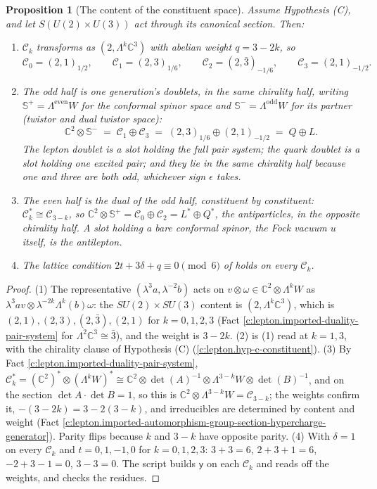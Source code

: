\documentclass[11pt]{article}
\newtheorem{proposition}[theorem]{Proposition}
\theoremstyle{definition}
\theoremstyle{plain}
\providecommand{\C}{}\renewcommand{\C}{\mathbb{C}}
\providecommand{\CS}{}\renewcommand{\CS}{{\mathbb{S}^{+}}}
\providecommand{\CSm}{}\renewcommand{\CSm}{{\mathbb{S}^{-}}}
\providecommand{\Con}{}\renewcommand{\Con}{\mathcal{C}}
\begin{document}
\begin{proposition}[The content of the constituent space]\label{c:lepton.content-constituent-space}
Assume Hypothesis (C), and let $S(U(2) \times U(3))$ act through its canonical section. Then:
\begin{enumerate}
\item $\Con_{k}$ transforms as $(2, \Lambda^{k}\C^{3})$ with abelian weight $q = 3 - 2k$, so
\[
\Con_{0} = (2,1)_{1/2}, \qquad \Con_{1} = (2,3)_{1/6}, \qquad \Con_{2} = (2,\bar{3})_{-1/6}, \qquad \Con_{3} = (2,1)_{-1/2}.
\]
\item The odd half is one generation's doublets, in the same chirality half, writing $\CS = \Lambda^{\mathrm{even}}W$ for the conformal spinor space and $\CSm{} = \Lambda^{\mathrm{odd}}W$ for its partner (twistor and dual twistor space):
\[
\C^{2} \otimes \CSm{} \;=\; \Con_{1} \oplus \Con_{3} \;=\; (2,3)_{1/6} \oplus (2,1)_{-1/2} \;=\; Q \oplus L.
\]
The lepton doublet is a slot holding the full pair system; the quark doublet is a slot holding one excited pair; and they lie in the same chirality half because one and three are both odd, whichever sign $\epsilon$ takes.
\item The even half is the dual of the odd half, constituent by constituent: $\Con_{k}^{*} \cong \Con_{3-k}$, so $\C^{2} \otimes \CS = \Con_{0} \oplus \Con_{2} = L^{*} \oplus Q^{*}$, the antiparticles, in the opposite chirality half. A slot holding a bare conformal spinor, the Fock vacuum $u$ itself, is the antilepton.
\item The lattice condition $2t + 3\delta + q \equiv 0 \pmod 6$ of \cite[Thm.~4.2(ii)]{ButlerT12} holds on every $\Con_{k}$.
\end{enumerate}
\end{proposition}
\begin{proof}
(1) The representative $(\lambda^{3}a, \lambda^{-2}b)$ acts on $v \otimes \omega \in \C^{2} \otimes \Lambda^{k}W$ as $\lambda^{3}av \otimes \lambda^{-2k}\Lambda^{k}(b)\omega$: the $SU(2) \times SU(3)$ content is $(2, \Lambda^{k}\C^{3})$, which is $(2,1), (2,3), (2,\bar{3}), (2,1)$ for $k = 0, 1, 2, 3$ (Fact \ref{c:lepton.imported-duality-pair-system} for $\Lambda^{2}\C^{3} \cong \bar{3}$), and the weight is $3 - 2k$. (2) is (1) read at $k = 1, 3$, with the chirality clause of Hypothesis (C) (\ref{c:lepton.hyp-c-constituent}). (3) By Fact \ref{c:lepton.imported-duality-pair-system}, $\Con_{k}^{*} = (\C^{2})^{*} \otimes (\Lambda^{k}W)^{*} \cong \C^{2} \otimes \det(A)^{-1} \otimes \Lambda^{3-k}W \otimes \det(B)^{-1}$, and on the section $\det A \cdot \det B = 1$, so this is $\C^{2} \otimes \Lambda^{3-k}W = \Con_{3-k}$; the weights confirm it, $-(3 - 2k) = 3 - 2(3-k)$, and irreducibles are determined by content and weight (Fact \ref{c:lepton.imported-automorphism-group-section-hypercharge-generator}). Parity flips because $k$ and $3 - k$ have opposite parity. (4) With $\delta = 1$ on every $\Con_{k}$ and $t = 0, 1, -1, 0$ for $k = 0, 1, 2, 3$: $3 + 3 = 6$, $2 + 3 + 1 = 6$, $-2 + 3 - 1 = 0$, $3 - 3 = 0$. The script builds $\mathsf{y}$ on each $\Con_{k}$ and reads off the weights, and checks the residues.

\end{proof}
\end{document}
